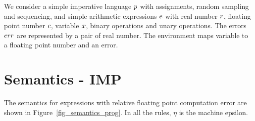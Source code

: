 \documentclass[a4paper,11pt]{article}
\begin{document}

We consider a simple imperative language $p$ with assignments, random sampling and sequencing, and simple arithmetic expressions $e$ with real number $r$, floating point number $c$, variable $x$, binary operations and unary operations. The errors $err$ are represented by a pair of real number. The environment maps variable to a floating point number and an error.
%
%
%
\section{Semantics - IMP}
%
The semantics for expressions with relative
floating point computation error are shown in
Figure~\ref{fig_semantics_prog}. 
In all the rules, $\eta$ is the machine epsilon.
\end{document}
